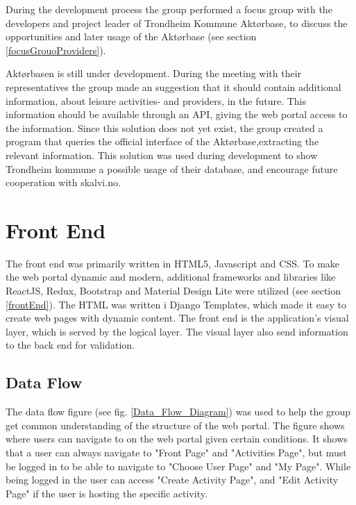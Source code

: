 During the development process the group performed a focus group with the developers and project leader of Trondheim Kommune Aktørbase, to discuss the opportunities and later usage of the Aktørbase (see section \ref{focusGrouoProviders}).

Aktørbasen is still under development. During the meeting with their representatives the group made an suggestion that it should contain additional information, about leisure activities- and providers, in the future. This information should be available through an API, giving the web portal access to the information. Since this solution does not yet exist, the group created a program that queries the official interface of the Aktørbase,extracting the relevant information. This solution was used during development to show Trondheim kommune a possible usage of their database, and encourage future cooperation with skalvi.no. 

\section{Front End}
The front end was primarily written in HTML5, Javascript and CSS. To make the web portal dynamic and modern, additional frameworks and libraries like ReactJS, Redux, Bootstrap and Material Design Lite were utilized (see section \ref{frontEnd}). The HTML was written i Django Templates, which made it easy to create web pages with dynamic content. The front end is the application's visual layer, which is served by the logical layer. The visual layer also send information to the back end for validation.


\subsection{Data Flow}
The data flow figure (see fig. \ref{Data_Flow_Diagram}) was used to help the group get common understanding of the structure of the web portal. The figure shows where users can navigate to on the web portal given certain conditions. It shows that a user can always navigate to "Front Page" and "Activities Page", but must be logged in to be able to navigate to "Choose User Page" and "My Page". While being logged in the user can access "Create Activity Page", and "Edit Activity Page" if the user is hosting the specific activity. 

